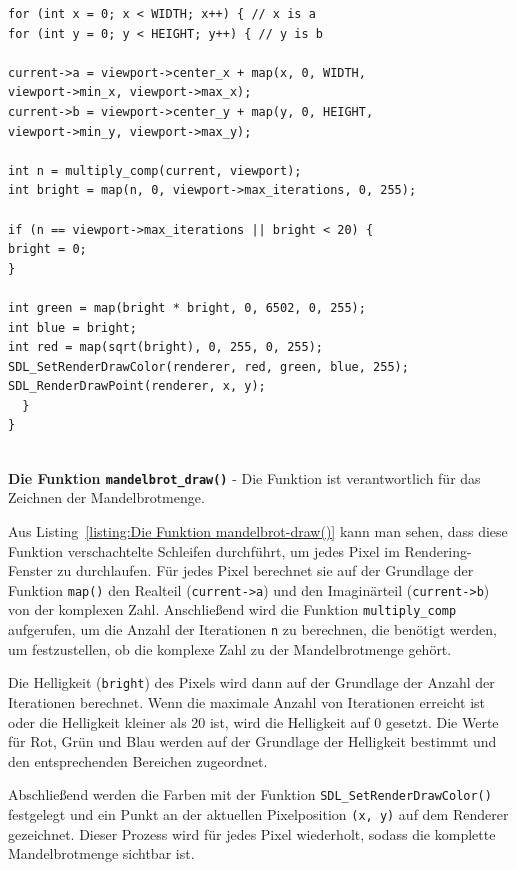 \documentclass[ngerman,12pt,a4paper,titlepage]{article}
\begin{document}
\begin{sloppypar}
	
\begin{listing}[H]
	\begin{verbatim}
for (int x = 0; x < WIDTH; x++) { // x is a
for (int y = 0; y < HEIGHT; y++) { // y is b
				
current->a = viewport->center_x + map(x, 0, WIDTH,
viewport->min_x, viewport->max_x);
current->b = viewport->center_y + map(y, 0, HEIGHT,
viewport->min_y, viewport->max_y);
				
int n = multiply_comp(current, viewport);
int bright = map(n, 0, viewport->max_iterations, 0, 255);
				
if (n == viewport->max_iterations || bright < 20) {
bright = 0;
}
				
int green = map(bright * bright, 0, 6502, 0, 255);
int blue = bright;
int red = map(sqrt(bright), 0, 255, 0, 255);
SDL_SetRenderDrawColor(renderer, red, green, blue, 255);
SDL_RenderDrawPoint(renderer, x, y);
  }
}
		
	\end{verbatim}
	\caption[\textbf{Die Funktion \texttt{mandelbrot\_draw()}}]{\textbf{Die Funktion \texttt{mandelbrot\_draw()}} - Die Funktion ist verantwortlich für das Zeichnen der Mandelbrotmenge.}
	\label{listing:Die Funktion mandelbrot-draw()}
\end{listing}

Aus Listing~\ref{listing:Die Funktion mandelbrot-draw()} kann man sehen, dass diese Funktion verschachtelte Schleifen durchführt, um jedes Pixel im Rendering-Fenster zu durchlaufen. Für jedes Pixel berechnet sie auf der Grundlage der Funktion \texttt{map()} den Realteil (\texttt{current->a}) und den Imaginärteil (\texttt{current->b}) von der komplexen Zahl. Anschließend wird die Funktion \texttt{multiply\_comp} aufgerufen, um die Anzahl der Iterationen \texttt{n} zu berechnen, die benötigt werden, um festzustellen, ob die komplexe Zahl zu der Mandelbrotmenge gehört.

Die Helligkeit (\texttt{bright}) des Pixels wird dann auf der Grundlage der Anzahl der Iterationen berechnet. Wenn die maximale Anzahl von Iterationen erreicht ist oder die Helligkeit kleiner als 20 ist, wird die Helligkeit auf 0 gesetzt. Die Werte für Rot, Grün und Blau werden auf der Grundlage der Helligkeit bestimmt und den entsprechenden Bereichen zugeordnet.

Abschließend werden die Farben mit der Funktion \texttt{SDL\_SetRenderDrawColor()} festgelegt und ein Punkt an der aktuellen Pixelposition \texttt{(x, y)} auf dem Renderer gezeichnet. Dieser Prozess wird für jedes Pixel wiederholt, sodass die komplette Mandelbrotmenge sichtbar ist.

\end{sloppypar}
\end{document}
